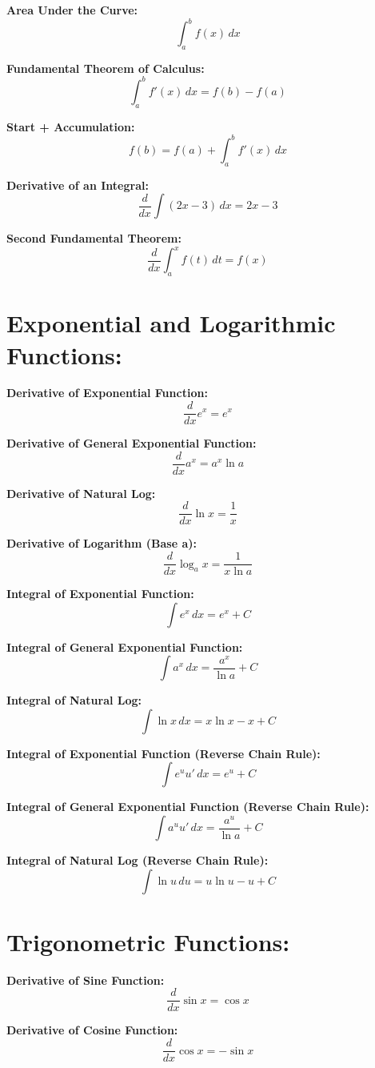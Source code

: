 \documentclass{article}
\begin{document}
\textbf{Area Under the Curve:}
\[
\int_{a}^{b} f(x) \, dx
\]

\textbf{Fundamental Theorem of Calculus:}
\[
\int_{a}^{b} f'(x) \, dx = f(b) - f(a)
\]

\textbf{Start + Accumulation:}
\[
f(b) = f(a) + \int_{a}^{b} f'(x) \, dx
\]

\textbf{Derivative of an Integral:}
\[
\frac{d}{dx} \int (2x-3)\, dx = 2x-3
\]

\textbf{Second Fundamental Theorem:}
\[
\frac{d}{dx} \int_{a}^{x} f(t) \, dt = f(x)
\]

\section*{\textbf{Exponential and Logarithmic Functions:}}

\textbf{Derivative of Exponential Function:}
\[
\frac{d}{dx} e^x = e^x
\]

\textbf{Derivative of General Exponential Function:}
\[
\frac{d}{dx} a^x = a^x \ln a
\]

\textbf{Derivative of Natural Log:}
\[
\frac{d}{dx} \ln x = \frac{1}{x}
\]

\textbf{Derivative of Logarithm (Base a):}
\[
\frac{d}{dx} \log_a x = \frac{1}{x \ln a}
\]

\textbf{Integral of Exponential Function:}
\[
\int e^x \, dx = e^x + C
\]

\textbf{Integral of General Exponential Function:}
\[
\int a^x \, dx = \frac{a^x}{\ln a} + C
\]

\textbf{Integral of Natural Log:}
\[
\int \ln x \, dx = x \ln x - x + C
\]

\textbf{Integral of Exponential Function (Reverse Chain Rule):}
\[
\int e^{u} u' \, dx = e^{u} + C
\]

\textbf{Integral of General Exponential Function (Reverse Chain Rule):}
\[
\int a^{u} u' \, dx = \frac{a^{u}}{\ln a} + C
\]

\textbf{Integral of Natural Log (Reverse Chain Rule):}
\[
\int \ln u \, du = u \ln u - u + C
\]

\section*{\textbf{Trigonometric Functions:}}

\textbf{Derivative of Sine Function:}
\[
\frac{d}{dx} \sin x = \cos x
\]

\textbf{Derivative of Cosine Function:}
\[
\frac{d}{dx} \cos x = -\sin x
\]
\end{document}
